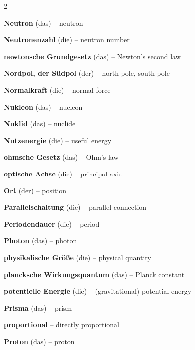 \begin{multicols}{2}
\par\nopagebreak
\textbf{Neutron} (das) -- neutron\dotfill\hyperref[e:264]{\pageref*{e:264}}\par
\textbf{Neutronenzahl} (die) -- neutron number\dotfill\hyperref[e:269]{\pageref*{e:269}}\par
\textbf{newtonsche Grundgesetz} (das) -- Newton's second law\dotfill\hyperref[e:77]{\pageref*{e:77}}\par
\textbf{Nordpol, der Südpol} (der) -- north pole, south pole\dotfill\hyperref[e:177]{\pageref*{e:177}}\par
\textbf{Normalkraft} (die) -- normal force\dotfill\hyperref[e:64]{\pageref*{e:64}}\par
\textbf{Nukleon} (das) -- nucleon\dotfill\hyperref[e:265]{\pageref*{e:265}}\par
\textbf{Nuklid} (das) -- nuclide\dotfill\hyperref[e:270]{\pageref*{e:270}}\par
\textbf{Nutzenergie} (die) -- useful energy\dotfill\hyperref[e:107]{\pageref*{e:107}}\par

\par\nopagebreak
\textbf{ohmsche Gesetz} (das) -- Ohm's law\dotfill\hyperref[e:147]{\pageref*{e:147}}\par
\textbf{optische Achse} (die) -- principal axis\dotfill\hyperref[e:243]{\pageref*{e:243}}\par
\textbf{Ort} (der) -- position\dotfill\hyperref[e:34]{\pageref*{e:34}}\par

\par\nopagebreak
\textbf{Parallelschaltung} (die) -- parallel connection\dotfill\hyperref[e:163]{\pageref*{e:163}}\par
\textbf{Periodendauer} (die) -- period\dotfill\hyperref[e:196]{\pageref*{e:196}}\par
\textbf{Photon} (das) -- photon\dotfill\hyperref[e:291]{\pageref*{e:291}}\par
\textbf{physikalische Größe} (die) -- physical quantity\dotfill\hyperref[e:1]{\pageref*{e:1}}\par
\textbf{plancksche Wirkungsquantum} (das) -- Planck constant\dotfill\hyperref[e:292]{\pageref*{e:292}}\par
\textbf{potentielle Energie} (die) -- (gravitational) potential energy\dotfill\hyperref[e:97]{\pageref*{e:97}}\par
\textbf{Prisma} (das) -- prism\dotfill\hyperref[e:254]{\pageref*{e:254}}\par
\textbf{proportional} -- directly proportional\dotfill\hyperref[e:25]{\pageref*{e:25}}\par
\textbf{Proton} (das) -- proton\dotfill\hyperref[e:263]{\pageref*{e:263}}\par


\end{multicols}
